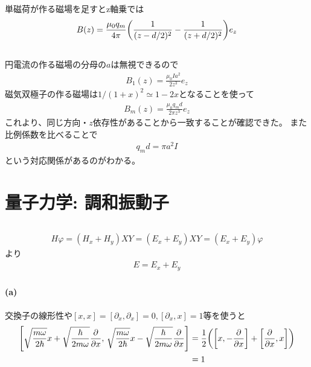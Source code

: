 \documentclass[../../master.tex]{subfiles}
\begin{document}
\section{}
単磁荷が作る磁場を足すとz軸乗では
\begin{align}
    B(z) =\frac{\mu_0q_m}{4\pi}\qty(\frac{1}{(z-d/2)^2}-\frac{1}{(z+d/2)^2})e_z
\end{align}

\section{}
円電流の作る磁場の分母の\(a\)は無視できるので
\begin{align}
    B_1(z) = \frac{\mu_0 Ia^2}{2z^3}e_z
\end{align}
磁気双極子の作る磁場は\(1/(1+x)^2\simeq 1-2x\)となることを使って
\begin{align}
    B_m(z) = \frac{\mu_0q_md}{2\pi z^3}e_z
\end{align}
これより、同じ方向・\(z\)依存性があることから一致することが確認できた。
また比例係数を比べることで
\begin{align}
    q_md = \pi a^2I
\end{align}
という対応関係があるのがわかる。


\chapter{量子力学: 調和振動子}
\section{}
\subsection{}
\begin{align}
    H\varphi = (H_x+ H_y)XY = (E_x+E_y)XY = (E_x+E_y)\varphi
\end{align}
より
\begin{align}
    E=E_x+E_y
\end{align}

\subsection{}
\subsubsection{(a)}
交換子の線形性や\([x,x]=[\partial_x,\partial_x]=0, [\partial_x, x]=1\)等を使うと
\begin{align}
    \qty[\sqrt{\frac{m\omega}{2\hbar}}x+\sqrt{\frac{\hbar}{2m\omega}}\pdv{x},\,
    \sqrt{\frac{m\omega}{2\hbar}}x-\sqrt{\frac{\hbar}{2m\omega}}\pdv{x}]
    &=\frac{1}{2}\qty(\qty[x, -\pdv{x}] + \qty[\pdv{x}, x])\\
    &= 1
\end{align}
\end{document}
